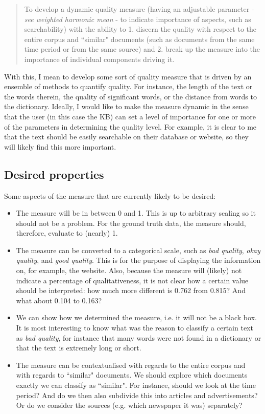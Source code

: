 \documentclass{article}
\begin{document}
	\begin{quote}
		To develop a dynamic quality measure (having an adjustable parameter - \textit{see weighted harmonic mean} - to indicate importance of aspects, such as searchability) with the ability to 1. discern the quality with respect to the entire corpus and ``similar" documents (such as documents from the same time period or from the same source) and 2. break up the measure into the importance of individual components driving it.
	\end{quote}

	With this, I mean to develop some sort of quality measure that is driven by an ensemble of methods to quantify quality. For instance, the length of the text or the words therein, the quality of significant words, or the distance from words to the dictionary. Ideally, I would like to make the measure dynamic in the sense that the user (in this case the KB) can set a level of importance for one or more of the parameters in determining the quality level. For example, it is clear to me that the text should be easily searchable on their database or website, so they will likely find this more important.
	
	\newpage
	
	\subsection{Desired properties}
	Some aspects of the measure that are currently likely to be desired:
	\begin{itemize}
		\item The measure will be in between 0 and 1. This is up to arbitrary scaling so it should not be a problem. For the ground truth data, the measure should, therefore, evaluate to (nearly) 1.
		\item The measure can be converted to a categorical scale, such as \textit{bad quality}, \textit{okay quality}, and \textit{good quality}. This is for the purpose of displaying the information on, for example, the website. Also, because the measure will (likely) not indicate a percentage of qualitativeness, it is not clear how a certain value should be interpreted: how much more different is 0.762 from 0.815? And what about 0.104 to 0.163?
		\item We can show how we determined the measure, i.e. it will not be a black box. It is most interesting to know what was the reason to classify a certain text as \textit{bad quality}, for instance that many words were not found in a dictionary or that the text is extremely long or short.
		\item The measure can be contextualised with regards to the entire corpus and with regards to ``similar" documents. We should explore which documents exactly we can classify as ``similar". For instance, should we look at the time period? And do we then also subdivide this into articles and advertisements? Or do we consider the sources (e.g. which newspaper it was) separately?
	\end{itemize}
	
\end{document}
